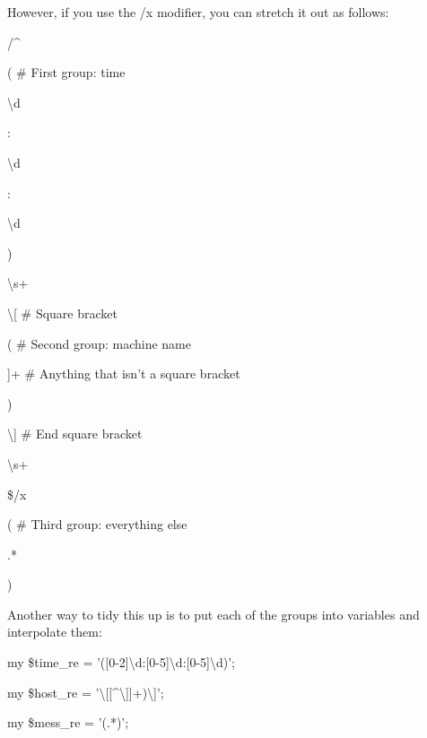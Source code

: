 \documentclass[a4paper,11pt]{book}
\begin{document}
\noindent 

\noindent 

\noindent However, if you use the /x modifier, you can stretch it out as follows:

\noindent 

\noindent 

\noindent /\^{}

\noindent ( \# First group: time

\noindent [0-2]\textbackslash d

\noindent :

\noindent [0-5]\textbackslash d

\noindent :

\noindent [0-5]\textbackslash d

\noindent )

\noindent \textbackslash s+

\noindent \textbackslash [ \# Square bracket

\noindent ( \# Second group: machine name

\noindent [\^{}\textbackslash ]]+ \# Anything that isn't a square bracket

\noindent )

\noindent \textbackslash ] \# End square bracket

\noindent 

\noindent 

\noindent \textbackslash s+

\noindent 

\noindent 

\noindent 

\noindent \$/x

\noindent 

\noindent ( \# Third group: everything else

\noindent .*

\noindent )

\noindent 

\noindent Another way to tidy this up is to put each of the groups into variables and interpolate them:

\noindent 

\noindent my \$time\_re = '([0-2]\textbackslash d:[0-5]\textbackslash d:[0-5]\textbackslash d)';

\noindent my \$host\_re = '\textbackslash [[\^{}\textbackslash ]]+)\textbackslash ]';

\noindent my \$mess\_re = '(.*)';

\noindent 
\end{document}
